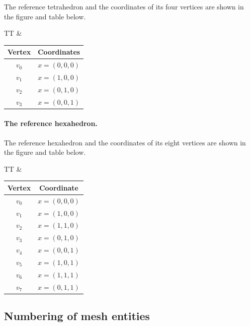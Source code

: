 The reference tetrahedron and the coordinates of its four vertices are
shown in the figure and table below.

\begin{center}
\bwfig
  \begin{tabular}{TT}
    &
    \begin{tabular}{cc}
      \toprule
      Vertex & Coordinates \\
      \hline
      $v_0$ & $x = (0, 0, 0)$ \\
      $v_1$ & $x = (1, 0, 0)$ \\
      $v_2$ & $x = (0, 1, 0)$ \\
      $v_3$ & $x = (0, 0, 1)$ \\
      \bottomrule
    \end{tabular}
  \end{tabular}
\end{center}

\paragraph{The reference hexahedron.}

The reference hexahedron and the coordinates of its eight vertices are
shown in the figure and table below.

\begin{center}
\bwfig
  \begin{tabular}{TT}
    &
    \begin{tabular}{cc}
      \toprule
      Vertex & Coordinate \\
      \hline
      $v_0$ & $x = (0, 0, 0)$ \\
      $v_1$ & $x = (1, 0, 0)$ \\
      $v_2$ & $x = (1, 1, 0)$ \\
      $v_3$ & $x = (0, 1, 0)$ \\
      $v_4$ & $x = (0, 0, 1)$ \\
      $v_5$ & $x = (1, 0, 1)$ \\
      $v_6$ & $x = (1, 1, 1)$ \\
      $v_7$ & $x = (0, 1, 1)$ \\
      \bottomrule
    \end{tabular}
  \end{tabular}
\end{center}


\subsection{Numbering of mesh entities}

